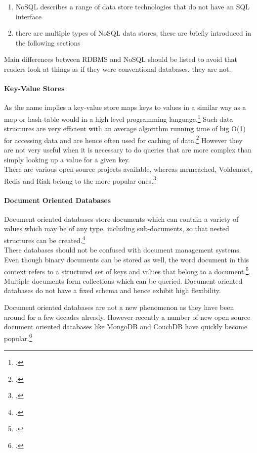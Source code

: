 \begin{enumerate}
  \item NoSQL describes a range of data store technologies that do not have an SQL interface
  \item there are multiple types of NoSQL data stores, these are briefly introduced in the following sections
\end{enumerate}
Main differences between RDBMS and NoSQL should be listed to avoid that readers
look at things as if they were conventional databases. they are not.

\paragraph{Key-Value Stores}
\label{sec:nosql-key-value}
As the name implies a key-value store maps keys to values in a similar way as a
map or hash-table would in a high level programming
language.\footcite[Cf.][4]{Redmond_2012} Such data structures are very efficient
with an average algorithm running time of big O(1) for accessing data and
are hence often used for caching of data.\footcite[Cf.][p. 14 et sq.]{Tiwari_2011}
However they are not very useful when it is necessary to do queries that are
more complex than simply looking up a value for a given key.\\
There are various open source projects available, whereas memcached, Voldemort,
Redis and Riak belong to the more popular ones.\footcite[Cf.][4]{Redmond_2012}

 
\paragraph{Document Oriented Databases}
\label{sec:nosql-document}
Document oriented databases store documents which can contain a variety of
values which may be of any type, including sub-documents, so that nested 
structures can be created.\footcite[Cf.][p. 5 et sq.]{Redmond_2012}\\
These databases should not be confused with document management systems. Even
though binary documents can be stored as well, the word document in this context
refers to a structured set of keys and values that belong to a
document.\footcite[Cf.][p. 18 et sq.]{Tiwari_2011}.\\
Multiple documents form collections which can be queried. Document oriented
databases do not have a fixed schema and hence exhibit high flexibility.

Document oriented databases are not a new phenomenon as they have been around
for a few decades already. However recently a number of new open source document 
oriented databases like MongoDB and CouchDB have quickly become popular.\footcite[Cf.][p. 18 et sq.]{Tiwari_2011}


